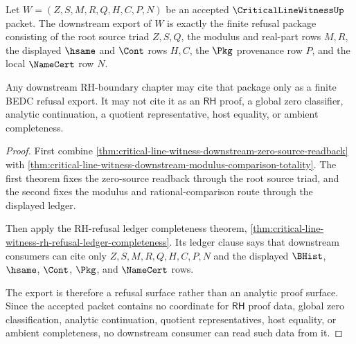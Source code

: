 \begin{theorem}
\label{thm:critical-line-witness-downstream-refusal-export}
Let $W=(Z,S,M,R,Q,H,C,P,N)$ be an accepted $\CriticalLineWitnessUp$ packet. The downstream export of $W$ is exactly the finite refusal package consisting of the root source triad $Z,S,Q$, the modulus and real-part rows $M,R$, the displayed $\hsame$ and $\Cont$ rows $H,C$, the $\Pkg$ provenance row $P$, and the local $\NameCert$ row $N$.

Any downstream RH-boundary chapter may cite that package only as a finite BEDC refusal export. It may not cite it as an $\mathsf{RH}$ proof, a global zero classifier, analytic continuation, a quotient representative, host equality, or ambient completeness.
\end{theorem}
\begin{proof}
First combine \autoref{thm:critical-line-witness-downstream-zero-source-readback} with \autoref{thm:critical-line-witness-downstream-modulus-comparison-totality}. The first theorem fixes the zero-source readback through the root source triad, and the second fixes the modulus and rational-comparison route through the displayed ledger.

Then apply the RH-refusal ledger completeness theorem, \autoref{thm:critical-line-witness-rh-refusal-ledger-completeness}. Its ledger clause says that downstream consumers can cite only $Z,S,M,R,Q,H,C,P,N$ and the displayed $\BHist$, $\hsame$, $\Cont$, $\Pkg$, and $\NameCert$ rows.

The export is therefore a refusal surface rather than an analytic proof surface. Since the accepted packet contains no coordinate for $\mathsf{RH}$ proof data, global zero classification, analytic continuation, quotient representatives, host equality, or ambient completeness, no downstream consumer can read such data from it.
\end{proof}
